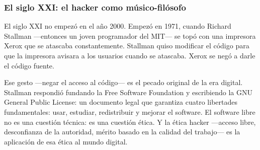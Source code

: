 \documentclass[14pt, a4paper]{article}
\begin{document}
\subsubsection{El siglo XXI: el hacker como músico-filósofo}
\label{siglo-xxi}
El siglo XXI no empezó en el año 2000. Empezó en 1971, cuando Richard
Stallman —entonces un joven programador del MIT— se topó con una
impresora Xerox que se atascaba constantemente. Stallman quiso
modificar el código para que la impresora avisara a los usuarios
cuando se atascaba. Xerox se negó a darle el código fuente.

Ese gesto —negar el acceso al código— es el pecado original de la era
digital. Stallman respondió fundando la Free Software Foundation y
escribiendo la GNU General Public License: un documento legal que
garantiza cuatro libertades fundamentales: usar, estudiar, redistribuir
y mejorar el software. El software libre no es una cuestión técnica:
es una cuestión ética. Y la ética hacker —acceso libre, desconfianza
de la autoridad, mérito basado en la calidad del trabajo— es la
aplicación de esa ética al mundo digital.
\end{document}

